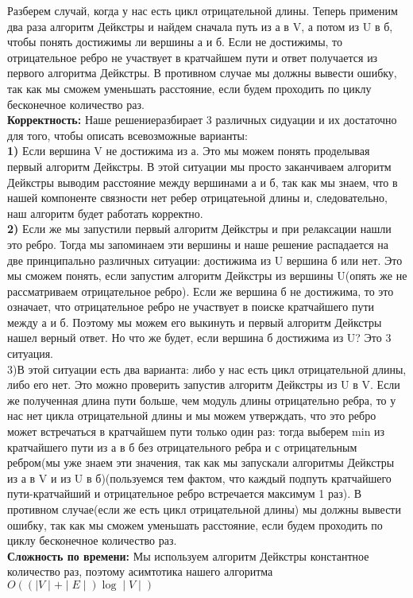 \documentclass[a4paper,12pt]{article}
\begin{document}
Разберем случай, когда у нас есть цикл отрицательной длины. Теперь применим два раза алгоритм Дейкстры и найдем сначала путь из а в V, а потом из  U в б, чтобы понять достижимы ли вершины а и б. Если не достижимы, то отрицательное ребро не участвует в кратчайшем пути и ответ получается из первого алгоритма Дейкстры. В противном случае мы должны вывести ошибку, так как мы сможем уменьшать расстояние, если будем проходить по циклу бесконечное количество раз.\\
\textbf{Корректность:} Наше решениеразбирает 3 различных сидуации и их достаточно для того, чтобы описать всевозможные варианты:\\
\textbf{1)} Если вершина V не достижима из а. Это мы можем понять проделывая первый алгоритм Дейкстры. В этой ситуации мы просто заканчиваем алгоритм Дейкстры  выводим расстояние между вершинами а и б, так как мы знаем, что в нашей компоненте связности нет ребер отрицатеьной длины и, следовательно, наш алгоритм будет работать корректно.\\
\textbf{2)} Если же мы запустили первый алгоритм Дейкстры и при релаксации нашли это ребро. Тогда мы запоминаем эти вершины и наше решение распадается на две принципально различных ситуации: достижима из U вершина б или нет. Это мы сможем понять, если запустим алгоритм Дейкстры из вершины U(опять же не рассматриваем отрицательное ребро). Если же вершина б не достижима, то это означает, что отрицательное ребро не участвует в поиске кратчайшего пути между а и б. Поэтому мы можем его выкинуть и первый алгоритм Дейкстры нашел верный ответ. Но что же будет, если вершина б достижима из U? Это 3 ситуация.\\
3)В этой ситуации есть два варианта: либо у нас есть цикл отрицательной длины, либо его нет. Это можно проверить запустив алгоритм Дейкстры из U в V. Если же полученная длина пути больше, чем модуль длины отрицательно ребра, то у нас нет цикла отрицательной длины и мы можем утверждать, что это ребро может встречаться в кратчайшем пути только один раз: тогда выберем min из кратчайшего пути из а в б без отрицательного ребра и с отрицательным ребром(мы уже знаем эти значения, так как мы запускали алгоритмы Дейкстры из а в V и из  U в б)(пользуемся тем фактом, что каждый подпуть кратчайшего пути-кратчайший и отрицательное ребро встречается максимум 1 раз). В противном случае(если же есть цикл отрицательной длины) мы должны вывести ошибку, так как мы сможем уменьшать расстояние, если будем проходить по циклу бесконечное количество раз.\\
\textbf{Сложность по времени:} Мы используем алгоритм Дейкстры константное количество раз, поэтому асимтотика нашего алгоритма $O((\mid V \mid + \mid E \mid ) \log \mid V \mid)$\\
\end{document}
